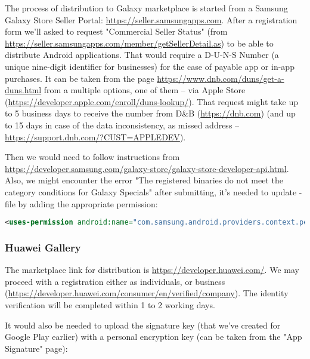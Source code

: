 The process of distribution to Galaxy marketplace is started from a Samsung Galaxy Store Seller Portal:
\href{https://seller.samsungapps.com}{https://seller.samsungapps.com}.
After a registration form we'll asked to request "Commercial Seller Status" (from 
\href{https://seller.samsungapps.com/member/getSellerDetail.as}{https://seller.samsungapps.com/member/getSellerDetail.as})
to be able to distribute Android applications. That would require a D-U-N-S Number (a unique nine-digit identifier for 
businesses) for the case of payable app or in-app purchases. It can be taken from the page 
\href{https://www.dnb.com/duns/get-a-duns.html}{ https://www.dnb.com/duns/get-a-duns.html}
from a multiple options, one of them -- via Apple Store 
(\href{https://developer.apple.com/enroll/duns-lookup/}{https://developer.apple.com/enroll/duns-lookup/}).
That request might take up to 5 business days to receive the number from D\&B (\href{https://dnb.com}{https://dnb.com})
(and up to 15 days in case of the data inconsistency, as missed address -- 
\href{https://support.dnb.com/?CUST=APPLEDEV}{https://support.dnb.com/?CUST=APPLEDEV}). 

Then we would need to follow instructions  from 
\href{https://developer.samsung.com/galaxy-store/galaxy-store-developer-api.html}{https://developer.samsung.com/galaxy-store/galaxy-store-developer-api.html}.
Also, we might encounter the error "The registered binaries do not meet the category conditions for Galaxy Specials" 
after submitting, it's needed to update -file by adding the appropriate permission:

\begin{lstlisting}[language=xml]
<uses-permission android:name="com.samsung.android.providers.context.permission.WRITE_USE_APP_FEATURE_SURVEY"/>
\end{lstlisting}

\subsubsection{Huawei Gallery}

The marketplace link for distribution is \href{https://developer.huawei.com/}{https://developer.huawei.com/}.
We may proceed with a registration either as individuals, or business 
(\href{https://developer.huawei.com/consumer/en/verified/company}{https://developer.huawei.com/consumer/en/verified/company}).
The identity verification will be completed within 1 to 2 working days.

It would also be needed to upload the signature key (that we've created for Google Play earlier) with a 
personal encryption key (can be taken from the "App Signature" page):

